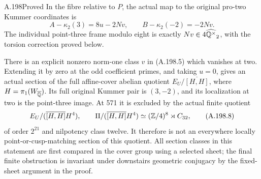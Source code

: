 \begin{statement}{A.198}{Proved}
In the fibre relative to \(P\), the actual map to the original
pro-two Kummer coordinates is
\[
 A-\kappa_2(3)=8u-2Nv,\qquad
 B-\kappa_2(-2)=-2Nv.
\tag{A.198.7}
\]
The individual point-three frame modulo eight is exactly
\(Nv\in4\widehat{\mathbb Q^\times}_2\), with the torsion correction
proved below.

There is an explicit nonzero norm-one class \(v\) in (A.198.5)
which vanishes at two.  Extending it by zero at the odd coefficient
primes, and taking \(u=0\), gives an actual section of the full
affine-cover abelian quotient \(E_U/\overline{[H,H]}\), where
\(H=\pi_1(W_{\overline{\mathbb Q}})\).  Its full original Kummer pair
is \((3,-2)\), and its localization at two is the point-three
image.  At 571 it is excluded by the actual finite quotient
\[
 E_U/(\overline{[H,H]}H^4),\qquad
 \Pi/(\overline{[H,H]}H^4)
       \simeq(\mathbb Z/4)^8\rtimes C_{32},
\tag{A.198.8}
\]
of order \(2^{21}\) and nilpotency class twelve.
It therefore is not an everywhere locally point-or-cusp-matching
section of this quotient.  All section classes in this statement
are first compared in the cover group using a selected sheet;
the final finite obstruction is invariant under downstairs
geometric conjugacy by the fixed-sheet argument in the proof.
\end{statement}

